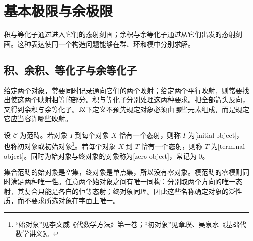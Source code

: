 
\section{基本极限与余极限}
\label{b4:sec:0201}

积与等化子通过进入它们的态射刻画；余积与余等化子通过从它们出发的态射刻画。这种表达使同一个构造问题能够在群、环和模中分别求解。

%
%

\subsection{积、余积、等化子与余等化子}
\label{b4:subsec:0201:01}

给定两个对象，常要同时记录通向它们的两个映射；给定两个平行映射，则常要找出使这两个映射相等的部分。积与等化子分别处理这两种要求。把全部箭头反向，又得到余积与余等化子。以下定义不预先规定对象必须由哪些元素组成，而是规定它应当容许哪些映射。

\begin{definition}\label{b4:def:initial-terminal-zero}
	设 \(\mathcal C\) 为范畴。若对象 \(I\) 到每个对象 \(X\) 恰有一个态射，则称 \(I\) 为[initial object]，也称初对象或初始对象\footnote{“始对象”见李文威《代数学方法》第一卷\cite[第 2.4 节]{Li2018AlgebraMethodsI}；“初对象”见章璞、吴泉水《基础代数学讲义》\cite[第 4.7 节“初对象存在性定理”]{ZhangWu2018FoundationAlgebra}。}。若每个对象 \(X\) 到 \(T\) 恰有一个态射，则称 \(T\) 为[terminal object]。同时为始对象与终对象的对象称为[zero object]，常记为 \(0\)。
\end{definition}

集合范畴的始对象是空集，终对象是单点集，所以没有零对象。模范畴的零模则同时满足两种唯一性。任意两个始对象之间有唯一同构：分别取两个方向的唯一态射，其复合只能是各自的恒等态射；终对象同理。因此这些名称确定对象的泛性质，而不要求所选对象在字面上唯一。


